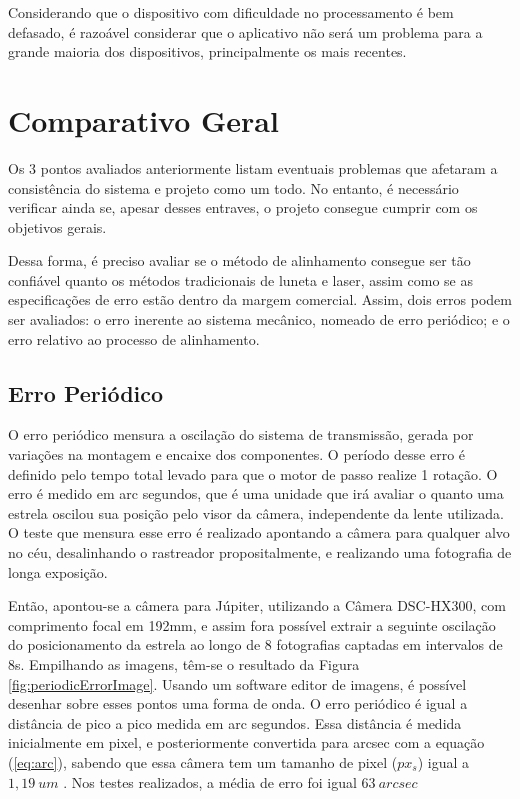 Considerando que o dispositivo com dificuldade no processamento é bem defasado, é razoável considerar que o aplicativo não será um problema para a grande maioria dos dispositivos, principalmente os mais recentes. 

\section{Comparativo Geral}
Os 3 pontos avaliados anteriormente listam eventuais problemas que afetaram a consistência do sistema e projeto como um todo. No entanto, é necessário verificar ainda se, apesar desses entraves, o projeto consegue cumprir com os objetivos gerais.

Dessa forma, é preciso avaliar se o método de alinhamento consegue ser tão confiável quanto os métodos tradicionais de luneta e laser, assim como se as especificações de erro estão dentro da margem comercial. Assim, dois erros podem ser avaliados: o erro inerente ao sistema mecânico, nomeado de erro periódico; e o erro relativo ao processo de alinhamento.


\subsection{Erro Periódico}

O erro periódico mensura a oscilação do sistema de transmissão, gerada por variações na montagem e encaixe dos componentes. O período desse erro é definido pelo tempo total levado para que o motor de passo realize 1 rotação. O erro é medido em arc segundos, que é uma unidade que irá avaliar o quanto uma estrela oscilou sua posição pelo visor da câmera, independente da lente utilizada. O teste que mensura esse erro é realizado apontando a câmera para qualquer alvo no céu, desalinhando o rastreador propositalmente, e realizando uma fotografia de longa exposição. 

Então, apontou-se a câmera para Júpiter, utilizando a Câmera DSC-HX300, com comprimento focal em 192mm, e assim fora possível extrair a seguinte oscilação do posicionamento da estrela ao longo de 8 fotografias captadas em intervalos de 8s. Empilhando as imagens, têm-se o resultado da Figura \ref{fig:periodicErrorImage}. Usando um software editor de imagens, é possível desenhar sobre esses pontos uma forma de onda. O erro periódico é igual a distância de pico a pico medida em arc segundos. Essa distância é medida inicialmente em pixel, e posteriormente convertida para arcsec com a equação (\ref{eq:arc}), sabendo que essa câmera tem um tamanho de pixel ($ px_s $) igual a  $ 1,19~um $ . Nos testes realizados, a média de erro foi igual  $ 63~arcsec  $


